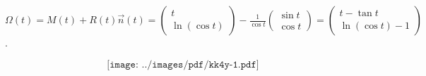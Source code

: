 {{\begin{center}
$\Omega(t)=M(t)+R(t)\overrightarrow{n}(t)=\left(
\begin{array}{c}
t\\
\ln(\cos t)
\end{array}
\right)-\frac{1}{\cos t}\left(
\begin{array}{c}
\sin t\\
\cos t
\end{array}
\right)=\left(
\begin{array}{c}
t-\tan t\\
\ln(\cos t)-1
\end{array}
\right)$.
\end{center}

$$\texttt{[image: ../images/pdf/kk4y-1.pdf]}$$
}
}
